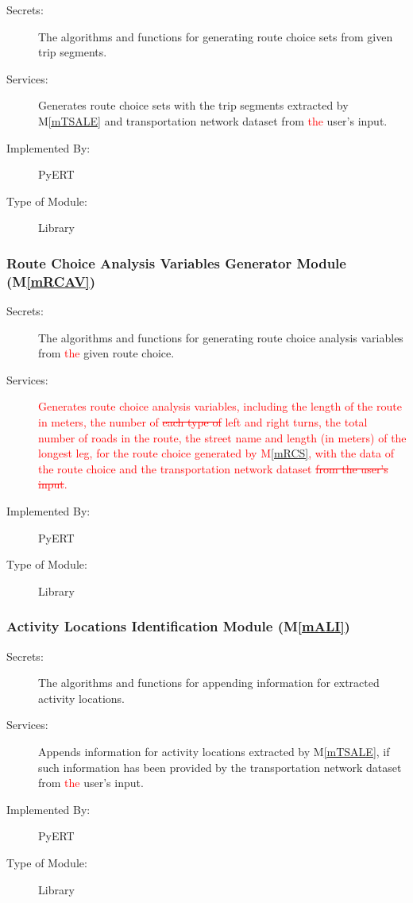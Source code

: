 \documentclass[12pt, titlepage]{article}
\newcommand{\mref}[1]{M\ref{#1}}
\begin{document}
\begin{description}
\item[Secrets:]The algorithms and functions for generating route choice sets from given trip segments.
\item[Services:]Generates route choice sets with the trip segments extracted by \mref{mTSALE} and transportation network dataset from \textcolor{red}{the} user's input.
\item[Implemented By:] PyERT
\item[Type of Module:] Library
\end{description}

\subsubsection{Route Choice Analysis Variables Generator Module (\mref{mRCAV})}

\begin{description}
\item[Secrets:]The algorithms and functions for generating route choice analysis variables from \textcolor{red}{the} given route choice.
\item[Services:]\textcolor{red}{Generates route choice analysis variables, including the length of the route in meters, the number of \sout{each type of} left and right turns, the total number of roads in the route, the street name and length (in meters) of the longest leg, for the route choice generated by \mref{mRCS}, with the data of the route choice and the transportation network dataset \sout{from the user's input}.}
\item[Implemented By:] PyERT
\item[Type of Module:] Library
\end{description}

\subsubsection{Activity Locations Identification Module (\mref{mALI})}

\begin{description}
\item[Secrets:]The algorithms and functions for appending information for extracted activity locations.
\item[Services:]Appends information for activity locations extracted by \mref{mTSALE}, if such information has been provided by the transportation network dataset from \textcolor{red}{the} user's input.
\item[Implemented By:] PyERT
\item[Type of Module:] Library
\end{description}
\end{document}

